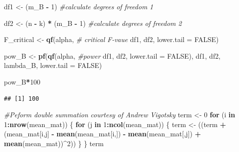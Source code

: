 \documentclass[
]{book}
\newenvironment{Shaded}{\begin{snugshade}}{\end{snugshade}}
\newcommand{\CommentTok}[1]{\textcolor[rgb]{0.56,0.35,0.01}{\textit{#1}}}
\newcommand{\ControlFlowTok}[1]{\textcolor[rgb]{0.13,0.29,0.53}{\textbf{#1}}}
\newcommand{\DataTypeTok}[1]{\textcolor[rgb]{0.13,0.29,0.53}{#1}}
\newcommand{\DecValTok}[1]{\textcolor[rgb]{0.00,0.00,0.81}{#1}}
\newcommand{\KeywordTok}[1]{\textcolor[rgb]{0.13,0.29,0.53}{\textbf{#1}}}
\newcommand{\NormalTok}[1]{#1}
\newcommand{\OperatorTok}[1]{\textcolor[rgb]{0.81,0.36,0.00}{\textbf{#1}}}
\newcommand{\OtherTok}[1]{\textcolor[rgb]{0.56,0.35,0.01}{#1}}
\newcommand{\StringTok}[1]{\textcolor[rgb]{0.31,0.60,0.02}{#1}}
\begin{document}
\begin{Shaded}
\begin{Highlighting}[]
\NormalTok{df1 <-}\StringTok{ }\NormalTok{(m_B }\OperatorTok{-}\StringTok{ }\DecValTok{1}\NormalTok{) }\CommentTok{#calculate degrees of freedom 1}

\NormalTok{df2 <-}\StringTok{ }\NormalTok{(n }\OperatorTok{-}\StringTok{ }\NormalTok{k) }\OperatorTok{*}\StringTok{ }\NormalTok{(m_B }\OperatorTok{-}\StringTok{ }\DecValTok{1}\NormalTok{) }\CommentTok{#calculate degrees of freedom 2}

\NormalTok{F_critical <-}\StringTok{ }\KeywordTok{qf}\NormalTok{(alpha, }\CommentTok{# critical F-vaue}
\NormalTok{                 df1,}
\NormalTok{                 df2,}
                 \DataTypeTok{lower.tail =} \OtherTok{FALSE}\NormalTok{) }

\NormalTok{pow_B <-}\StringTok{ }\KeywordTok{pf}\NormalTok{(}\KeywordTok{qf}\NormalTok{(alpha, }\CommentTok{#power }
\NormalTok{             df1, }
\NormalTok{             df2, }
             \DataTypeTok{lower.tail =} \OtherTok{FALSE}\NormalTok{), }
\NormalTok{          df1, }
\NormalTok{          df2, }
\NormalTok{          lambda_B, }
          \DataTypeTok{lower.tail =} \OtherTok{FALSE}\NormalTok{)}


\NormalTok{pow_B}\OperatorTok{*}\DecValTok{100}
\end{Highlighting}
\end{Shaded}

\begin{verbatim}
## [1] 100
\end{verbatim}

\begin{Shaded}
\begin{Highlighting}[]
\CommentTok{#Peform double summation courtesy of Andrew Vigotsky}
\NormalTok{term <-}\StringTok{ }\DecValTok{0}
\ControlFlowTok{for}\NormalTok{ (i }\ControlFlowTok{in} \DecValTok{1}\OperatorTok{:}\KeywordTok{nrow}\NormalTok{(mean_mat)) \{}
  \ControlFlowTok{for}\NormalTok{ (j }\ControlFlowTok{in} \DecValTok{1}\OperatorTok{:}\KeywordTok{ncol}\NormalTok{(mean_mat)) \{}
\NormalTok{    term <-}\StringTok{ }\NormalTok{((term }\OperatorTok{+}\StringTok{ }\NormalTok{(mean_mat[i,j] }\OperatorTok{-}
\StringTok{                        }\KeywordTok{mean}\NormalTok{(mean_mat[i,]) }\OperatorTok{-}\StringTok{ }
\StringTok{                        }\KeywordTok{mean}\NormalTok{(mean_mat[,j]) }\OperatorTok{+}\StringTok{ }\KeywordTok{mean}\NormalTok{(mean_mat))}\OperatorTok{^}\DecValTok{2}\NormalTok{))}
\NormalTok{  \}}
\NormalTok{\}}
\NormalTok{term}
\end{Highlighting}
\end{Shaded}
\end{document}
